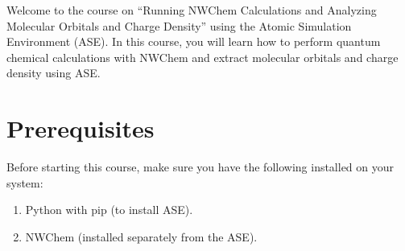 \documentclass[letterpaper,10pt,english]{sphinxmanual}
\begin{document}
\sphinxAtStartPar
Welcome to the course on “Running NWChem Calculations and Analyzing Molecular Orbitals and Charge Density” using the Atomic Simulation Environment (ASE). In this course, you will learn how to perform quantum chemical calculations with NWChem and extract molecular orbitals and charge density using ASE.


\section{Prerequisites}
\label{\detokenize{nwase/nwase:prerequisites}}
\sphinxAtStartPar
Before starting this course, make sure you have the following installed on your system:
\begin{enumerate}
%
\item {} 
\sphinxAtStartPar
Python with pip (to install ASE).

\item {} 
\sphinxAtStartPar
NWChem (installed separately from the ASE).

\end{enumerate}
\end{document}
